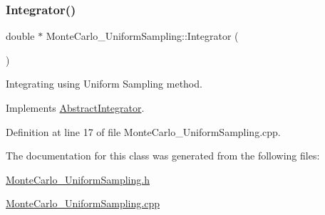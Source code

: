 \subsubsection{\texorpdfstring{Integrator()}{Integrator()}}
{\footnotesize\ttfamily double $\ast$ Monte\+Carlo\+\_\+\+Uniform\+Sampling\+::\+Integrator (\begin{DoxyParamCaption}{ }\end{DoxyParamCaption})\hspace{0.3cm}{\ttfamily [virtual]}}



Integrating using Uniform Sampling method. 



Implements \hyperlink{class_abstract_integrator_a073d8f87239f732b3d2832070caa3b17}{Abstract\+Integrator}.



Definition at line 17 of file Monte\+Carlo\+\_\+\+Uniform\+Sampling.\+cpp.



The documentation for this class was generated from the following files\+:\begin{DoxyCompactItemize}
\item 
\hyperlink{_monte_carlo___uniform_sampling_8h}{Monte\+Carlo\+\_\+\+Uniform\+Sampling.\+h}\item 
\hyperlink{_monte_carlo___uniform_sampling_8cpp}{Monte\+Carlo\+\_\+\+Uniform\+Sampling.\+cpp}\end{DoxyCompactItemize}
